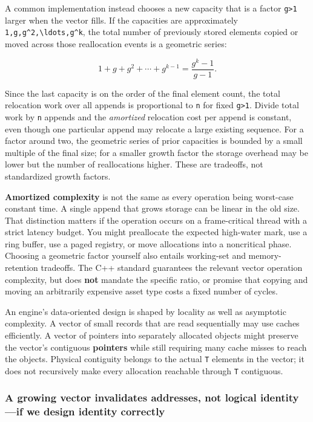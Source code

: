 A common implementation instead chooses a new capacity that is a factor \texttt{g\textgreater{}1} larger when the vector fills. If the capacities are approximately \texttt{1,g,g\^{}2,\textbackslash{}ldots,g\^{}k}, the total number of previously stored elements copied or moved across those reallocation events is a geometric series:

\[
1+g+g^2+\cdots+g^{k-1}
=\frac{g^k-1}{g-1}.
\]

Since the last capacity is on the order of the final element count, the total relocation work over all appends is proportional to \texttt{n} for fixed \texttt{g\textgreater{}1}. Divide total work by \texttt{n} appends and the \emph{amortized} relocation cost per append is constant, even though one particular append may relocate a large existing sequence. For a factor around two, the geometric series of prior capacities is bounded by a small multiple of the final size; for a smaller growth factor the storage overhead may be lower but the number of reallocations higher. These are tradeoffs, not standardized growth factors.

\textbf{Amortized complexity} is not the same as every operation being worst-case constant time. A single append that grows storage can be linear in the old size. That distinction matters if the operation occurs on a frame-critical thread with a strict latency budget. You might preallocate the expected high-water mark, use a ring buffer, use a paged registry, or move allocations into a noncritical phase. Choosing a geometric factor yourself also entails working-set and memory-retention tradeoffs. The C++ standard guarantees the relevant vector operation complexity, but does \textbf{not} mandate the specific ratio, or promise that copying and moving an arbitrarily expensive asset type costs a fixed number of cycles.

An engine's data-oriented design is shaped by locality as well as asymptotic complexity. A vector of small records that are read sequentially may use caches efficiently. A vector of pointers into separately allocated objects might preserve the vector's contiguous \textbf{pointers} while still requiring many cache misses to reach the objects. Physical contiguity belongs to the actual \texttt{T} elements in the vector; it does not recursively make every allocation reachable through \texttt{T} contiguous.

\subsubsection{A growing vector invalidates addresses, not logical identity---if we design identity correctly}\label{a-growing-vector-invalidates-addresses-not-logical-identityif-we-design-identity-correctly}

